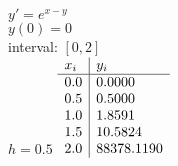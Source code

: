 {
$y' = e^{x-y}$\\
$y(0)=0$\\
interval: $[0,2]$\\
$h = 0.5$
}
{
	$\begin{array}[b]{l | l}
		x_i & y_i    \\ \hline
		0.0 & 0.0000 \\
		0.5 & 0.5000 \\
		1.0 & 1.8591 \\
		1.5 & 10.5824 \\
		2.0 & 88378.1190 \\
	\end{array}$
}